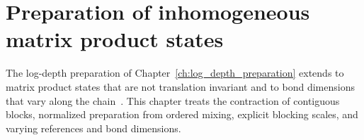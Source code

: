 \chapter{Preparation of inhomogeneous matrix product states}
\label{ch:log_depth_inhomogeneous}

The log-depth preparation of Chapter~\ref{ch:log_depth_preparation} extends to
matrix product states that are not translation invariant and to bond dimensions
that vary along the chain~\cite{Malz2024Preparation}. This chapter treats the
contraction of contiguous blocks, normalized preparation from ordered mixing,
explicit blocking scales, and varying references and bond dimensions.












